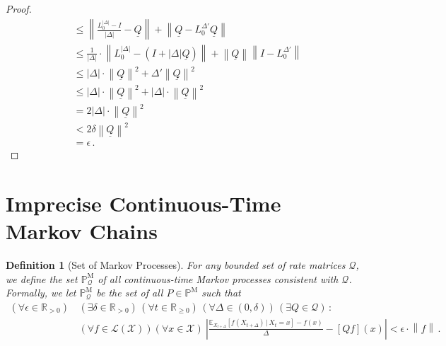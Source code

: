 \documentclass[10pt]{paper}
\newtheorem{definition}{Definition}
\newcommand{\reals}{\mathbb{R}}
\newcommand{\realspos}{\reals_{>0}}
\newcommand{\realsnonneg}{\reals_{\geq 0}}
\newcommand{\states}{\mathcal{X}}
\newcommand{\processes}{\mathbb{P}}
\newcommand{\mprocesses}{\processes^{\mathrm{M}}}
\newcommand{\gambles}{\mathcal{L}}
\newcommand{\gamblesX}{\gambles(\states)}
\newcommand{\rateset}{\mathcal{Q}}
\newcommand{\lrate}{\underline{Q}}
\newcommand{\norm}[1]{\left\lVert #1 \right\rVert}
\begin{document}
\begin{proof}
\begin{align*}
 &\leq \norm{\frac{L_{0}^{\lvert\Delta\rvert} - I}{\lvert\Delta\rvert} - \lrate} + \norm{\lrate - L_{0}^{\Delta'}\lrate} \\
 &\leq \frac{1}{\lvert\Delta\rvert}\cdot\norm{L_{0}^{\lvert\Delta\rvert} - (I+\lvert\Delta\rvert\lrate)} + \norm{\lrate}\norm{I - L_{0}^{\Delta'}} \\
 &\leq \lvert\Delta\rvert\cdot\norm{\lrate}^2 + \Delta'\norm{\lrate}^2 \\
 &\leq \lvert\Delta\rvert\cdot\norm{\lrate}^2 + \lvert\Delta\rvert\cdot\norm{\lrate}^2 \\
 &= 2\lvert\Delta\rvert\cdot\norm{\lrate}^2 \\
 &< 2\delta\norm{\lrate}^2 \\
 &= \epsilon\,.
\end{align*}
\end{proof}

\section{Imprecise Continuous-Time Markov Chains}\label{sec:imp_markov}



\begin{definition}[Set of Markov Processes]\label{def:markov_process_set_new}
For any bounded set of rate matrices $\rateset$, we define the set $\mprocesses_{\rateset}$ of all continuous-time Markov processes \emph{consistent} with $\rateset$. Formally, we let $\mprocesses_{\rateset}$ be the set of all $P\in\mprocesses$ such that
\begin{align*}\label{eq:conditionforMarkov_new}
(\forall\epsilon\in\realspos)&\,
(\exists\delta\in\realspos)\,
(\forall t\in\realsnonneg)\,
(\forall\Delta\in(0,\delta))\,
(\exists Q\in\rateset)\,:\\
 &\,(\forall f\in\gamblesX)(\forall x\in\states)~
\left\lvert\frac{\mathbb{E}_{X_{t+\Delta}}[f(X_{t+\Delta})\,\vert\,X_t=x]-f(x)}{\Delta}-\left[Qf\right](x)\right\rvert<\epsilon\cdot\norm{f}\,.
\end{align*}
\end{definition}
\end{document}
